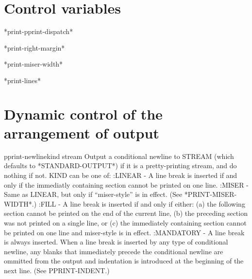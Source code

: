 \documentclass[10pt,english]{book}
\begin{document}
\section{Control variables}
\label{sec:control-variables}

\begin{variable}{*print-pprint-dispatch*}{}
  
\end{variable}

\begin{variable}{*print-right-margin*}{}
  
\end{variable}

\begin{variable}{*print-miser-width*}{}
  
\end{variable}

\begin{variable}{*print-lines*}{}
  
\end{variable}

\section{Dynamic control of the arrangement of output}
\label{sec:dynam-contr-arrang}

\begin{function}{pprint-newline}{kind \op stream}
  Output a conditional newline to STREAM (which defaults to
   *STANDARD-OUTPUT*) if it is a pretty-printing stream, and do
   nothing if not. KIND can be one of:
     :LINEAR - A line break is inserted if and only if the immediatly
        containing section cannot be printed on one line.
     :MISER - Same as LINEAR, but only if ``miser-style'' is in effect.
        (See *PRINT-MISER-WIDTH*.)
     :FILL - A line break is inserted if and only if either:
       (a) the following section cannot be printed on the end of the
           current line,
       (b) the preceding section was not printed on a single line, or
       (c) the immediately containing section cannot be printed on one
           line and miser-style is in effect.
     :MANDATORY - A line break is always inserted.
   When a line break is inserted by any type of conditional newline, any
   blanks that immediately precede the conditional newline are ommitted
   from the output and indentation is introduced at the beginning of the
   next line. (See PPRINT-INDENT.)
\end{function}
\end{document}
